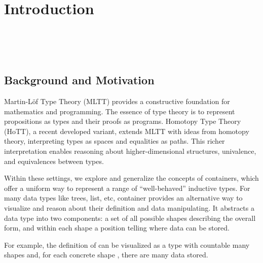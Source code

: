 \chapter{Introduction}

\begin{code}[hide]%
\>[0]\AgdaSpace{}%
\AgdaSpace{}%
\AgdaSymbol{:}\AgdaSpace{}%
\<%
\\
%
\\[\AgdaEmptyExtraSkip]%
\>[0]\AgdaSpace{}%
\AgdaSymbol{:}\AgdaSpace{}%
\<%
\\
\>[0]\AgdaSpace{}%
\AgdaSymbol{=}\AgdaSpace{}%
\<%
\end{code}

\section{Background and Motivation}

Martin-Löf Type Theory (MLTT) provides a constructive foundation for mathematics and programming. The essence of type theory is to represent propositions as types and their proofs as programs. Homotopy Type Theory (HoTT), a recent developed variant, extends MLTT with ideas from homotopy theory, interpreting types as spaces and equalities as paths. This richer interpretation enables reasoning about higher-dimensional structures, univalence, and equivalences between types.

Within these settings, we explore and generalize the concepts of containers, which offer a uniform way to represent a range of ``well-behaved'' inductive types. For many data types like trees, list, etc, container provides an alternative way to visualize and reason about their definition and data manipulating. It abstracts a data type into two components: a set of all possible shapes describing the overall form, and within each shape a position telling where data can be stored.

For example, the definition of   can be visualized as a type with countable many shapes  and, for each concrete shape  \AgdaSymbol{:} , there are  many data  stored.


